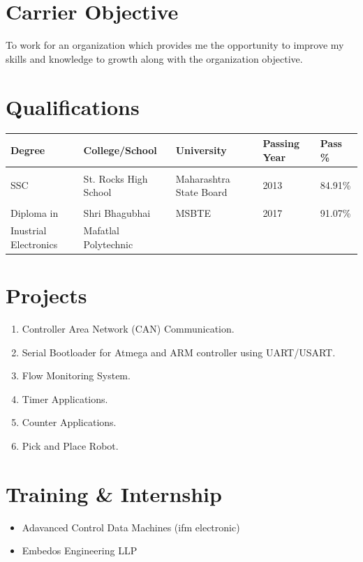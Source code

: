 \documentclass{article}
\begin{document}
\section{Carrier Objective}
To work for an organization which provides me the opportunity to improve my skills and knowledge to growth along with the organization objective.
		
\section{Qualifications}
	\begin{center}
		\begin{tabular}{l l l l l }
			Degree & College/School & University & Passing Year & Pass \% \\ \hline \\
			SSC & St. Rocks High School & Maharashtra State Board & 2013 & 84.91\% \\ \\
			Diploma in  & Shri Bhagubhai & MSBTE & 2017 & 91.07\% \\ 
			Inustrial Electronics & Mafatlal Polytechnic
		\end{tabular}
	\end{center}

\section{Projects}
	\begin{enumerate}
		\item Controller Area Network (CAN) Communication.
		\item Serial Bootloader for Atmega and ARM controller using UART/USART.
		\item Flow Monitoring System.
		\item Timer Applications. 
		\item Counter Applications.
		\item Pick and Place Robot.
	\end{enumerate}

\section{Training \& Internship}
	\begin{itemize}
		\item Adavanced Control Data Machines (ifm electronic)
		\item Embedos Engineering LLP
	\end{itemize}
\end{document}
